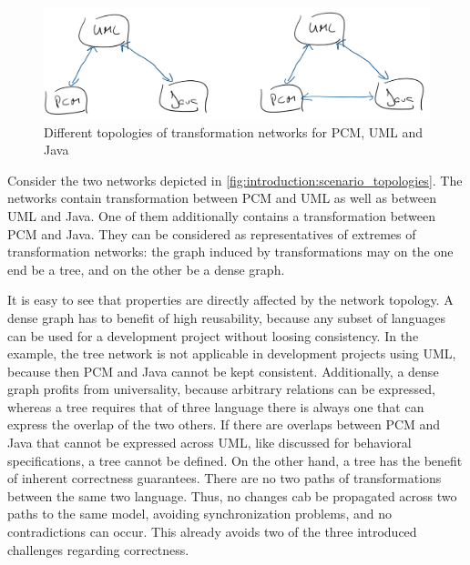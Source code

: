 \begin{figure}
    \centering
    \includegraphics[width=\textwidth]{figures/prologue/introduction/scenario_topologies.png}
    \caption[Example for network topologies]{Different topologies of transformation networks for \gls{PCM}, \gls{UML} and Java}
    \label{fig:introduction:scenario_topologies}
\end{figure}

Consider the two networks depicted in \autoref{fig:introduction:scenario_topologies}.
The networks contain transformation between \gls{PCM} and \gls{UML} as well as between \gls{UML} and Java. 
One of them additionally contains a transformation between \gls{PCM} and Java.
They can be considered as representatives of extremes of transformation networks:
the graph induced by transformations may on the one end be a tree, and on the other be a dense graph.

It is easy to see that properties are directly affected by the network topology.
A dense graph has to benefit of high reusability, because any subset of languages can be used for a development project without loosing consistency.
In the example, the tree network is not applicable in development projects using \gls{UML}, because then \gls{PCM} and Java cannot be kept consistent.
Additionally, a dense graph profits from universality, because arbitrary relations can be expressed, whereas a tree requires that of three language there is always one that can express the overlap of the two others.
If there are overlaps between \gls{PCM} and Java that cannot be expressed across \gls{UML}, like discussed for behavioral specifications, a tree cannot be defined.
On the other hand, a tree has the benefit of inherent correctness guarantees.
There are no two paths of transformations between the same two language.
Thus, no changes cab be propagated across two paths to the same model, avoiding synchronization problems, and no contradictions can occur.
This already avoids two of the three introduced challenges regarding correctness.

